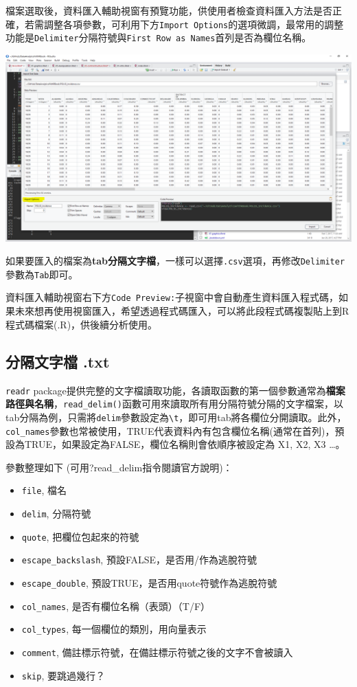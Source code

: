 \documentclass[]{book}
\providecommand{\tightlist}{%
  \setlength{\itemsep}{0pt}\setlength{\parskip}{0pt}}
\theoremstyle{definition}
\theoremstyle{definition}
\theoremstyle{remark}
\begin{document}
檔案選取後，資料匯入輔助視窗有預覽功能，供使用者檢查資料匯入方法是否正確，若需調整各項參數，可利用下方\texttt{Import\ Options}的選項微調，最常用的調整功能是\texttt{Delimiter}分隔符號與\texttt{First\ Row\ as\ Names}首列是否為欄位名稱。

\includegraphics[width=26.67in]{figure/csv2}

如果要匯入的檔案為\textbf{tab分隔文字檔}，一樣可以選擇\texttt{.csv}選項，再修改\texttt{Delimiter}參數為\texttt{Tab}即可。

資料匯入輔助視窗右下方\texttt{Code\ Preview:}子視窗中會自動產生資料匯入程式碼，如果未來想再使用視窗匯入，希望透過程式碼匯入，可以將此段程式碼複製貼上到R程式碼檔案(.R)，供後續分析使用。

\subsection{分隔文字檔 .txt}\label{-.txt}

\texttt{readr} \citep{R-readr}
package提供完整的文字檔讀取功能，各讀取函數的第一個參數通常為\textbf{檔案路徑與名稱}，\texttt{read\_delim()}函數可用來讀取所有用分隔符號分隔的文字檔案，以tab分隔為例，只需將\texttt{delim}參數設定為\texttt{\textbackslash{}t}，即可用tab將各欄位分開讀取。此外，\texttt{col\_names}參數也常被使用，TRUE代表資料內有包含欄位名稱(通常在首列)，預設為TRUE，如果設定為FALSE，欄位名稱則會依順序被設定為
X1, X2, X3 \ldots{}。

參數整理如下 (可用?read\_delim指令閱讀官方說明)：

\begin{itemize}
\tightlist
\item
  \texttt{file}, 檔名
\item
  \texttt{delim}, 分隔符號
\item
  \texttt{quote}, 把欄位包起來的符號
\item
  \texttt{escape\_backslash}, 預設FALSE，是否用/作為逃脫符號
\item
  \texttt{escape\_double}, 預設TRUE，是否用quote符號作為逃脫符號
\item
  \texttt{col\_names}, 是否有欄位名稱（表頭）（T/F）
\item
  \texttt{col\_types}, 每一個欄位的類別，用向量表示
\item
  \texttt{comment}, 備註標示符號，在備註標示符號之後的文字不會被讀入
\item
  \texttt{skip}, 要跳過幾行？
\end{itemize}
\end{document}
